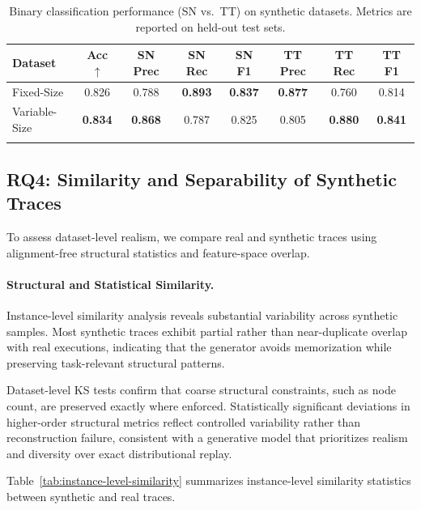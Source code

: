\documentclass[sigconf,review]{acmart}
\begin{document}
\begin{table}[t]
    \centering
    \begin{tabular}{lccccccc}
    \textbf{Dataset} & \textbf{Acc} $\uparrow$ &
    \textbf{SN Prec} & \textbf{SN Rec} & \textbf{SN F1} &
    \textbf{TT Prec} & \textbf{TT Rec} & \textbf{TT F1} \\
    \hline
    Fixed-Size
    & 0.826
    & 0.788 & \textbf{0.893} & \textbf{0.837}
    & \textbf{0.877} & 0.760 & 0.814 \\
    Variable-Size
    & \textbf{0.834}
    & \textbf{0.868} & 0.787 & 0.825
    & 0.805 & \textbf{0.880} & \textbf{0.841} \\\\
    \end{tabular}
   \caption{Binary classification performance (SN vs.\ TT) on synthetic datasets. Metrics are reported on held-out test sets.}
    \label{tab:synthetic_classification}
\end{table}


\subsection{RQ4: Similarity and Separability of Synthetic Traces}
\label{sec:rq4}


To assess dataset-level realism, we compare real and synthetic traces using alignment-free structural statistics and feature-space overlap.


\paragraph{Structural and Statistical Similarity.}
Instance-level similarity analysis reveals substantial variability across synthetic samples. Most synthetic traces exhibit partial rather than near-duplicate overlap with real executions, indicating that the generator avoids memorization while preserving task-relevant structural patterns.

Dataset-level KS tests confirm that coarse structural constraints, such as node count, are preserved exactly where enforced. Statistically significant deviations in higher-order structural metrics reflect controlled variability rather than reconstruction failure, consistent with a generative model that prioritizes realism and diversity over exact distributional replay.

Table~\ref{tab:instance-level-similarity} summarizes instance-level similarity statistics between synthetic and real traces.
\end{document}
